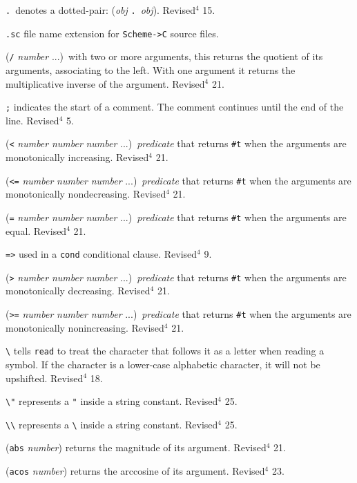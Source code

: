 \documentclass[10pt,twocolumn]{article}
\begin{document}
\texttt{.}\ denotes a dotted-pair: (\emph{obj} \texttt{.}\ \emph{obj}).  Revised$^4$ 15.

\texttt{.sc} file name extension for \texttt{Scheme->C} source files.

(\texttt{/} \emph{number} ...)\ with two or more arguments, this returns the
quotient of its arguments, associating to the left.  With one
argument it returns the multiplicative inverse of the argument.
Revised$^4$ 21.

\texttt{;} indicates the start of a comment.  The comment continues until
the end of the line.  Revised$^4$ 5.

(\texttt{<} \emph{number} \emph{number} \emph{number} ...)\ \emph{predicate} that returns
\texttt{\#t} when the arguments are monotonically increasing.
Revised$^4$ 21.

(\texttt{<=} \emph{number} \emph{number} \emph{number} ...)\ \emph{predicate} that returns
\texttt{\#t} when the arguments are monotonically nondecreasing.  Revised$^4$ 21.

(\texttt{=} \emph{number} \emph{number} \emph{number} ...)\ \emph{predicate} that returns
\texttt{\#t} when the arguments are equal.
Revised$^4$ 21.

\texttt{=>} used in a \texttt{cond} conditional clause.  Revised$^4$ 9.

(\texttt{>} \emph{number} \emph{number} \emph{number} ...)\ \emph{predicate} that returns
\texttt{\#t} when the arguments are monotonically decreasing.  Revised$^4$ 21.

(\texttt{>=} \emph{number} \emph{number} \emph{number} ...)\ \emph{predicate} that returns
\texttt{\#t} when the arguments are monotonically nonincreasing. Revised$^4$ 21.

\texttt{\textbackslash} tells \texttt{read} to treat the character that follows it as a
letter when reading a symbol.  If the character is a lower-case
alphabetic character, it will not be upshifted.  Revised$^4$ 18.

\texttt{\textbackslash"} represents a \texttt{"} inside a string constant.  Revised$^4$ 25.

\texttt{\textbackslash\textbackslash} represents a \texttt{\textbackslash} inside a string constant.  Revised$^4$ 25.

(\texttt{abs} \emph{number}) returns the magnitude of its argument.  Revised$^4$ 21.

(\texttt{acos} \emph{number}) returns the arccosine of its argument.
Revised$^4$ 23.
\end{document}
